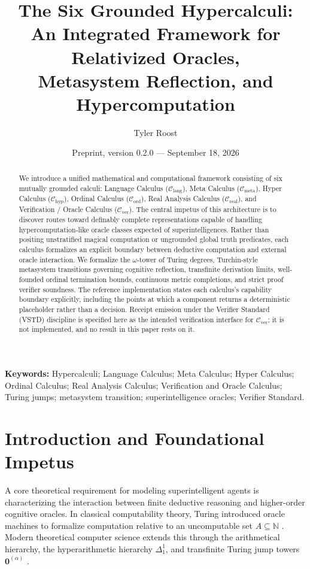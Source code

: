 \documentclass[11pt]{article}
\title{The Six Grounded Hypercalculi:\\An Integrated Framework for Relativized Oracles,\\Metasystem Reflection, and Hypercomputation}
\author{Tyler Roost}
\date{Preprint, version 0.2.0 --- September 18, 2026}
\theoremstyle{definition}
\newcommand{\N}{\mathbb N}
\begin{document}
\maketitle

\begin{abstract}
We introduce a unified mathematical and computational framework consisting of six mutually grounded calculi: Language Calculus ($\mathcal{C}_{\mathrm{lang}}$), Meta Calculus ($\mathcal{C}_{\mathrm{meta}}$), Hyper Calculus ($\mathcal{C}_{\mathrm{hyp}}$), Ordinal Calculus ($\mathcal{C}_{\mathrm{ord}}$), Real Analysis Calculus ($\mathcal{C}_{\mathrm{real}}$), and Verification / Oracle Calculus ($\mathcal{C}_{\mathrm{ver}}$). The central impetus of this architecture is to discover routes toward definably complete representations capable of handling hypercomputation-like oracle classes expected of superintelligences. Rather than positing unstratified magical computation or ungrounded global truth predicates, each calculus formalizes an explicit boundary between deductive computation and external oracle interaction. We formalize the $\omega$-tower of Turing degrees, Turchin-style metasystem transitions governing cognitive reflection, transfinite derivation limits, well-founded ordinal termination bounds, continuous metric completions, and strict proof verifier soundness. The reference implementation states each calculus's capability boundary explicitly, including the points at which a component returns a deterministic placeholder rather than a decision. Receipt emission under the Verifier Standard (VSTD) discipline is specified here as the intended verification interface for $\mathcal{C}_{\mathrm{ver}}$; it is not implemented, and no result in this paper rests on it.
\end{abstract}

\noindent\textbf{Keywords:} Hypercalculi; Language Calculus; Meta Calculus; Hyper Calculus; Ordinal Calculus; Real Analysis Calculus; Verification and Oracle Calculus; Turing jumps; metasystem transition; superintelligence oracles; Verifier Standard.

\section{Introduction and Foundational Impetus}
A core theoretical requirement for modeling superintelligent agents is characterizing the interaction between finite deductive reasoning and higher-order cognitive oracles. In classical computability theory, Turing introduced oracle machines to formalize computation relative to an uncomputable set $A \subseteq \N$ \cite{turing}. Modern theoretical computer science extends this through the arithmetical hierarchy, the hyperarithmetic hierarchy $\Delta^1_1$, and transfinite Turing jump towers $\mathbf{0}^{(\alpha)}$ \cite{rogers}.
\end{document}
